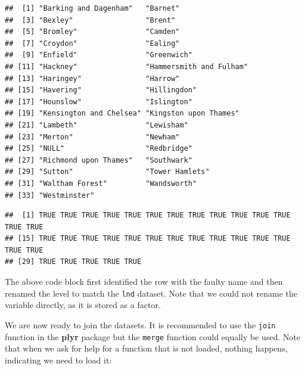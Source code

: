 \documentclass[]{article}
\newenvironment{Shaded}{}{}
\newcommand{\KeywordTok}[1]{\textcolor[rgb]{0.00,0.44,0.13}{\textbf{{#1}}}}
\newcommand{\DecValTok}[1]{\textcolor[rgb]{0.25,0.63,0.44}{{#1}}}
\newcommand{\StringTok}[1]{\textcolor[rgb]{0.25,0.44,0.63}{{#1}}}
\newcommand{\CommentTok}[1]{\textcolor[rgb]{0.38,0.63,0.69}{\textit{{#1}}}}
\newcommand{\NormalTok}[1]{{#1}}
\begin{document}
\begin{verbatim}
##  [1] "Barking and Dagenham"   "Barnet"                
##  [3] "Bexley"                 "Brent"                 
##  [5] "Bromley"                "Camden"                
##  [7] "Croydon"                "Ealing"                
##  [9] "Enfield"                "Greenwich"             
## [11] "Hackney"                "Hammersmith and Fulham"
## [13] "Haringey"               "Harrow"                
## [15] "Havering"               "Hillingdon"            
## [17] "Hounslow"               "Islington"             
## [19] "Kensington and Chelsea" "Kingston upon Thames"  
## [21] "Lambeth"                "Lewisham"              
## [23] "Merton"                 "Newham"                
## [25] "NULL"                   "Redbridge"             
## [27] "Richmond upon Thames"   "Southwark"             
## [29] "Sutton"                 "Tower Hamlets"         
## [31] "Waltham Forest"         "Wandsworth"            
## [33] "Westminster"
\end{verbatim}

\begin{Shaded}
\end{Shaded}

\begin{verbatim}
##  [1] TRUE TRUE TRUE TRUE TRUE TRUE TRUE TRUE TRUE TRUE TRUE TRUE TRUE TRUE
## [15] TRUE TRUE TRUE TRUE TRUE TRUE TRUE TRUE TRUE TRUE TRUE TRUE TRUE TRUE
## [29] TRUE TRUE TRUE TRUE TRUE
\end{verbatim}

The above code block first identified the row with the faulty name and
then renamed the level to match the \texttt{lnd} dataset. Note that we
could not rename the variable directly, as it is stored as a factor.

We are now ready to join the datasets. It is recommended to use the
\texttt{join} function in the \textbf{plyr} package but the
\texttt{merge} function could equally be used. Note that when we ask for
help for a function that is not loaded, nothing happens, indicating we
need to load it:
\end{document}
